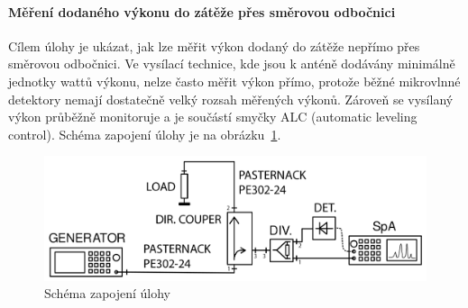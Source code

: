 \documentclass[11pt,a4paper]{article}
\begin{document}
\paragraph*{Měření dodaného výkonu do zátěže přes směrovou odbočnici} Cílem úlohy je ukázat, jak lze měřit výkon dodaný do zátěže nepřímo přes směrovou odbočnici. Ve vysílací technice, kde jsou k anténě dodávány minimálně jednotky wattů výkonu, nelze často měřit výkon přímo, protože běžné mikrovlnné detektory nemají dostatečně velký rozsah měřených výkonů. Zároveň se vysílaný výkon průběžně monitoruje a je součástí smyčky ALC (automatic leveling control). Schéma zapojení úlohy je na obrázku~\ref{fig:task2-zapojeni}.
\begin{figure}[!ht]
    \centering
    \includegraphics[width=.8\textwidth]{src/task2-zapojeni.png}
    \caption{\label{fig:task2-zapojeni}Schéma zapojení úlohy}
\end{figure}
\end{document}
